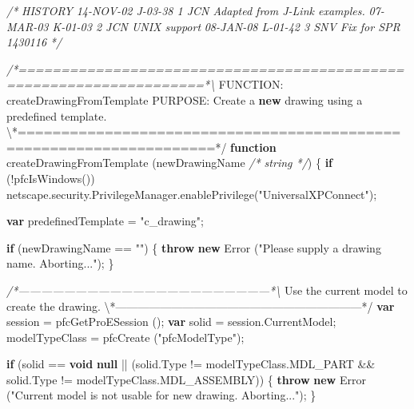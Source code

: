 \documentclass[]{article}
\newenvironment{Shaded}{}{}
\newcommand{\KeywordTok}[1]{\textcolor[rgb]{0.00,0.44,0.13}{\textbf{{#1}}}}
\newcommand{\StringTok}[1]{\textcolor[rgb]{0.25,0.44,0.63}{{#1}}}
\newcommand{\CommentTok}[1]{\textcolor[rgb]{0.38,0.63,0.69}{\textit{{#1}}}}
\newcommand{\OtherTok}[1]{\textcolor[rgb]{0.00,0.44,0.13}{{#1}}}
\newcommand{\FunctionTok}[1]{\textcolor[rgb]{0.02,0.16,0.49}{{#1}}}
\newcommand{\NormalTok}[1]{{#1}}
\begin{document}
\begin{Shaded}
\begin{Highlighting}[]
\CommentTok{/*}
\CommentTok{   HISTORY}
\CommentTok{   }
\CommentTok{14-NOV-02   J-03-38   $$1   JCN      Adapted from J-Link examples.}
\CommentTok{07-MAR-03   K-01-03   $$2   JCN      UNIX support}
\CommentTok{08-JAN-08   L-01-42   $$3   SNV      Fix for SPR 1430116}
\CommentTok{*/}

\CommentTok{/*====================================================================*\textbackslash{}}
\NormalTok{FUNCTION: createDrawingFromTemplate}
\NormalTok{PURPOSE:  Create a }\KeywordTok{new} \NormalTok{drawing using a predefined }\OtherTok{template}\NormalTok{.}
\NormalTok{\textbackslash{}*====================================================================*}\OtherTok{/}
\KeywordTok{function} \FunctionTok{createDrawingFromTemplate} \NormalTok{(newDrawingName }\CommentTok{/* string */}\NormalTok{)}
\NormalTok{\{}
  \KeywordTok{if} \NormalTok{(!}\FunctionTok{pfcIsWindows}\NormalTok{())}
    \OtherTok{netscape}\NormalTok{.}\OtherTok{security}\NormalTok{.}\OtherTok{PrivilegeManager}\NormalTok{.}\FunctionTok{enablePrivilege}\NormalTok{(}\StringTok{"UniversalXPConnect"}\NormalTok{);   }
  
  \KeywordTok{var} \NormalTok{predefinedTemplate = }\StringTok{"c_drawing"}\NormalTok{;}
  
  \KeywordTok{if} \NormalTok{(newDrawingName == }\StringTok{""}\NormalTok{)}
    \NormalTok{\{}
      \KeywordTok{throw} \KeywordTok{new} \FunctionTok{Error} \NormalTok{(}\StringTok{"Please supply a drawing name.  Aborting..."}\NormalTok{);}
    \NormalTok{\}}
  
\CommentTok{/*------------------------------------------------------------------*\textbackslash{}}
  \NormalTok{Use the current model to create the }\OtherTok{drawing}\NormalTok{.}
\NormalTok{\textbackslash{}*------------------------------------------------------------------*}\OtherTok{/}
  \KeywordTok{var} \NormalTok{session = }\FunctionTok{pfcGetProESession} \NormalTok{();}
  \KeywordTok{var} \NormalTok{solid = }\OtherTok{session}\NormalTok{.}\FunctionTok{CurrentModel}\NormalTok{;}
  \NormalTok{modelTypeClass = }\FunctionTok{pfcCreate} \NormalTok{(}\StringTok{"pfcModelType"}\NormalTok{);}
  
  \KeywordTok{if} \NormalTok{(solid == }\KeywordTok{void} \KeywordTok{null} \NormalTok{|| (}\OtherTok{solid}\NormalTok{.}\FunctionTok{Type} \NormalTok{!= }\OtherTok{modelTypeClass}\NormalTok{.}\FunctionTok{MDL_PART} \NormalTok{&& }
                 \OtherTok{solid}\NormalTok{.}\FunctionTok{Type} \NormalTok{!= }\OtherTok{modelTypeClass}\NormalTok{.}\FunctionTok{MDL_ASSEMBLY}\NormalTok{))}
    \NormalTok{\{}
      \KeywordTok{throw} \KeywordTok{new} \FunctionTok{Error} \NormalTok{(}\StringTok{"Current model is not usable for new drawing.  Aborting..."}\NormalTok{);}
    \NormalTok{\}}
  

\end{Highlighting}
\end{Shaded}
\end{document}

